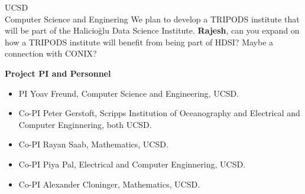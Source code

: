 \documentclass{letter}
\begin{document}
\begin{letter}{UCSD \\ Computer Science and Enginering}
We plan to develop a TRIPODS institute that will be part of the Halicio\u{g}lu Data Science Institute. {\bf Rajesh}, can you expand on how a TRIPODS institute will benefit from being part of HDSI? Maybe a connection with CONIX?


{\bf Project PI and Personnel}\\

\begin{itemize}
    \item PI Yoav Freund, Computer Science and Engineering, UCSD.
    \item Co-PI Peter Gerstoft, Scripps Institution of Oceanography and Electrical and Computer Enginnering, both UCSD.
    \item Co-PI Rayan Saab, Mathematics, UCSD.
    \item Co-PI Piya Pal, Electrical and Computer Enginnering, UCSD.
    \item Co-PI Alexander Cloninger, Mathematics, UCSD.
\end{itemize}


\end{letter}
\end{document}
